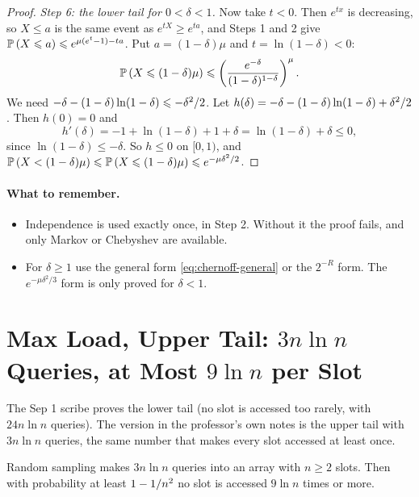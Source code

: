 \begin{proof}
    \emph{Step 6: the lower tail for $0 < \delta < 1$.} Now take $t < 0$. Then $e^{tx}$ is
    decreasing, so $X \leq a$ is the same event as $e^{tX} \geq e^{ta}$, and Steps 1 and 2 give
    $\operatorname{\mathbb{P}}\left(X \leqslant a\right) \leqslant e^{\mu(e^t - 1) - ta}$. Put $a = (1-\delta)\mu$ and
    $t = \ln(1-\delta) < 0$:
    \[\operatorname{\mathbb{P}}\left(X \leqslant (1-\delta)\mu\right) \leqslant \left(\frac{e^{-\delta}}{(1-\delta)^{1-\delta}}\right)^{\mu}.\]
    We need $-\delta - (1-\delta)\ln(1-\delta) \leqslant -\delta^2/2$. Let
    $h(\delta) = -\delta - (1-\delta)\ln(1-\delta) + \delta^2/2$. Then $h(0) = 0$ and
    \[h'(\delta) = -1 + \ln(1-\delta) + 1 + \delta = \ln(1-\delta) + \delta \leq 0,\]
    since $\ln(1-\delta) \leq -\delta$. So $h \leq 0$ on $[0, 1)$, and
    $\operatorname{\mathbb{P}}\left(X < (1-\delta)\mu\right) \leqslant \operatorname{\mathbb{P}}\left(X \leqslant (1-\delta)\mu\right) \leqslant e^{-\mu\delta^2/2}$.
\end{proof}

\paragraph{What to remember.}
\begin{itemize}
    \item Independence is used exactly once, in Step 2. Without it the proof fails, and only Markov
          or Chebyshev are available.
    \item For $\delta \geq 1$ use the general form \cref{eq:chernoff-general} or the $2^{-R}$ form.
          The $e^{-\mu\delta^2/3}$ form is only proved for $\delta < 1$.
\end{itemize}

\section{Max Load, Upper Tail: $3n \ln n$ Queries, at Most $9 \ln n$ per Slot}\label{sec:maxload}

The Sep 1 scribe proves the lower tail (no slot is accessed too rarely, with $24 n \ln n$ queries).
The version in the professor's own notes is the upper tail with $3n \ln n$ queries, the same number
that makes every slot accessed at least once.

\begin{claim}\label{clm:maxload-pp}
    Random sampling makes $3n \ln n$ queries into an array with $n \geq 2$ slots. Then with
    probability at least $1 - 1/n^2$ no slot is accessed $9 \ln n$ times or more.
\end{claim}

